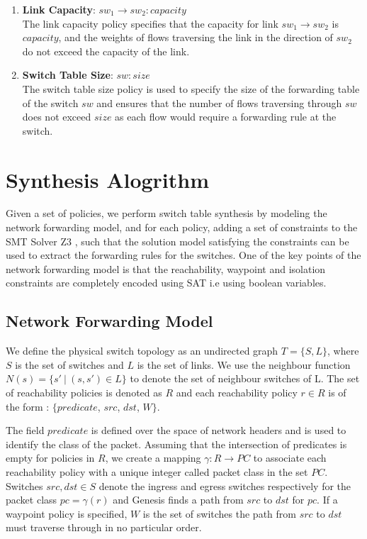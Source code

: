 \documentclass[]{sig}
\begin{document}
\begin{enumerate}
	\item \textbf{Link Capacity}: $sw_1 \rightarrow sw_2 : capacity$ \\
	The link capacity policy specifies that the capacity for link $sw_1 \rightarrow sw_2$ is $capacity$, and the weights of flows traversing the link in the direction of $sw_2$ do not exceed the capacity of the link.  
	\item \textbf{Switch Table Size}: $sw : size$ \\
	The switch table size policy is used to specify the size of the forwarding table of the switch $sw$ and ensures that the number of flows traversing through $sw$ does not exceed $size$ as each flow would require a forwarding rule at the switch.
\end{enumerate}
\section{Synthesis Alogrithm}
Given a set of policies, we perform switch table synthesis by modeling the network forwarding model, and for each policy, adding a set of constraints to the SMT Solver Z3 \cite{z3}, such that the solution model satisfying the constraints can be used to extract the forwarding rules for the switches. One of the key points of the network forwarding model is that the reachability, waypoint and isolation constraints are completely encoded using SAT i.e using boolean variables. 
\subsection{Network Forwarding Model} \label{sec:fwdmodel}
We define the physical switch topology as an undirected graph $T=\{S, L\}$, where $S$ is the set of switches and $L$ is the set of links. We use the neighbour function $N(s) = \{s'\ | \ (s,s') \in L \}$ to denote the set of neighbour switches of L. The set of reachability policies is denoted as $R$ and each reachability policy $r \in R$ is of the form : $\{predicate$, $src$, $dst$, $W\}$. 

The field $predicate$ is defined over the space of network headers and is used to identify the class of the packet. Assuming that the intersection of predicates is empty for policies in $R$, we create a mapping $\gamma : R \rightarrow PC$ to associate each reachability policy with a unique integer called packet class in the set $PC$. Switches $src, dst \in S$ denote the ingress and egress switches respectively for the packet class $pc = \gamma(r)$ and Genesis finds a path from $src$ to $dst$ for $pc$. If a waypoint policy is specified, $W$ is the set of switches the path from $src$ to $dst$ must traverse through in no particular order.
\end{document}
